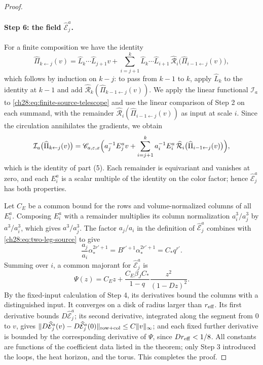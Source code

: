 \begin{proof}
\paragraph{Step 6: the field $\widehat{\mathcal E}_j^a$.}
For a finite composition we have the identity
\begin{equation}\label{ch28:eq:finite-source-telescope}
 \widehat\Pi_{k\leftarrow j}(v)=\widehat L_k\cdots\widehat L_{j+1}v+\sum_{i=j+1}^k\widehat L_k\cdots\widehat L_{i+1}\,\widehat{\mathcal R}_i\bigl(\widehat\Pi_{i-1\leftarrow j}(v)\bigr),
\end{equation}
which follows by induction on $k-j$: to pass from $k-1$ to $k$, apply $\widehat L_k$ to the identity at $k-1$ and add $\widehat{\mathcal R}_k(\widehat\Pi_{k-1\leftarrow j}(v))$. We apply the linear functional $\mathcal I_a$ to \eqref{ch28:eq:finite-source-telescope} and use the linear comparison of Step 2 on each summand, with the remainder $\widehat{\mathcal R}_i(\widehat\Pi_{i-1\leftarrow j}(v))$ as input at scale $i$. Since the circulation annihilates the gradients, we obtain
\[
 \mathcal I_a\bigl(\widehat\Pi_{k\leftarrow j}(v)\bigr)=\mathscr C_{a,\varepsilon,x}\Bigl(a_j^{-1}E_j^av+\sum_{i=j+1}^ka_i^{-1}E_i^a\,\widehat{\mathcal R}_i\bigl(\widehat\Pi_{i-1\leftarrow j}(v)\bigr)\Bigr),
\]
which is the identity of part (5). Each remainder is equivariant and vanishes at zero, and each $E_i^a$ is a scalar multiple of the identity on the color factor; hence $\widehat{\mathcal E}_j^a$ has both properties.

Let $C_E$ be a common bound for the rows and volume-normalized columns of all $E_i^a$. Composing $E_i^a$ with a remainder multiplies its column normalization $a_i^3/a_j^3$ by $a^3/a_i^3$, which gives $a^3/a_j^3$. The factor $a_j/a_i$ in the definition of $\widehat{\mathcal E}_j^a$ combines with \eqref{ch28:eq:two-leg-source} to give
\[
 \frac{a_j}{a_i}\alpha_*^{2r'+1}=B^{r'+1}\alpha_*^{2r'+1}=C_*q^{r'}.
\]
Summing over $i$, a common majorant for $\widehat{\mathcal E}_j^a$ is
\begin{equation}\label{ch28:eq:extension-majorant}
 \Psi(z)=C_Ez+\frac{C_E\beta_JC_*}{1-q}\frac{z^2}{(1-Dz)^2}.
\end{equation}
By the fixed-input calculation of Step 4, its derivatives bound the columns with a distinguished input. It converges on a disk of radius larger than $r_{\rm eff}$. Its first derivative bounds $D\widehat{\mathcal E}_j^a$; its second derivative, integrated along the segment from $0$ to $v$, gives $\|D\widehat{\mathcal E}_j^a(v)-D\widehat{\mathcal E}_j^a(0)\|_{\rm row+col}\le C\|v\|_\infty$; and each fixed further derivative is bounded by the corresponding derivative of $\Psi$, since $Dr_{\rm eff}<1/8$. All constants are functions of the coefficient data listed in the theorem; only Step 3 introduced the loops, the heat horizon, and the torus. This completes the proof.
\end{proof}

